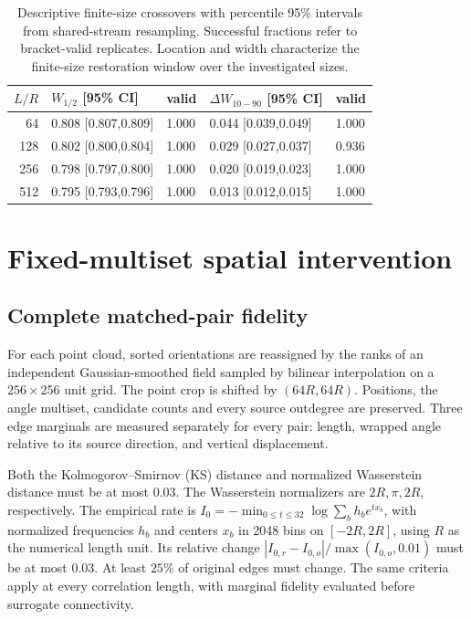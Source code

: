 \documentclass[11pt]{article}
\begin{document}
\begin{table}[H]\centering\small
\caption{Descriptive finite-size crossovers with percentile 95\% intervals from shared-stream resampling. Successful fractions refer to bracket-valid replicates. Location and width characterize the finite-size restoration window over the investigated sizes.}\label{tab:bootstrap}
\begin{tabular}{rllll}\toprule
$L/R$ & $W_{1/2}$ [95\% CI] & valid & $\Delta W_{10-90}$ [95\% CI] & valid \\
\midrule
64 & 0.808 [0.807,0.809] & 1.000 & 0.044 [0.039,0.049] & 1.000 \\
128 & 0.802 [0.800,0.804] & 1.000 & 0.029 [0.027,0.037] & 0.936 \\
256 & 0.798 [0.797,0.800] & 1.000 & 0.020 [0.019,0.023] & 1.000 \\
512 & 0.795 [0.793,0.796] & 1.000 & 0.013 [0.012,0.015] & 1.000 \\
\bottomrule\end{tabular}\end{table}

\FloatBarrier
\section{Fixed-multiset spatial intervention}
\subsection{Complete matched-pair fidelity}
For each point cloud, sorted orientations are reassigned by the ranks of an independent Gaussian-smoothed field sampled by bilinear interpolation on a $256\times256$ unit grid. The point crop is shifted by $(64R,64R)$. Positions, the angle multiset, candidate counts and every source outdegree are preserved. Three edge marginals are measured separately for every pair: length, wrapped angle relative to its source direction, and vertical displacement.

Both the Kolmogorov--Smirnov (KS) distance and normalized Wasserstein distance must be at most $0.03$. The Wasserstein normalizers are $2R,\pi,2R$, respectively. The empirical rate is $I_0=-\min_{0\leq t\leq32}\log\sum_b h_b e^{t x_b}$, with normalized frequencies $h_b$ and centers $x_b$ in 2048 bins on $[-2R,2R]$, using $R$ as the numerical length unit. Its relative change $|I_{0,r}-I_{0,o}|/\max(I_{0,o},0.01)$ must be at most $0.03$. At least $25\%$ of original edges must change. The same criteria apply at every correlation length, with marginal fidelity evaluated before surrogate connectivity.
\end{document}
